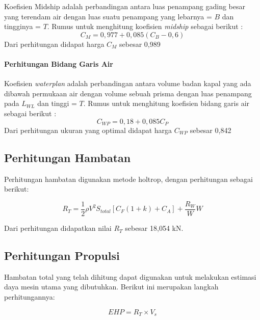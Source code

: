 Koefisien Midship adalah perbandingan antara luas penampang gading besar yang terendam air dengan luas suatu penampang yang lebarnya = $B$ dan tingginya = $T$. Rumus untuk menghitung koefisien \emph{midship} sebagai berikut \cite{Parsons_2001}:
\begin{equation}
    C_M = 0,977 + 0,085 (C_B - 0,6)
\end{equation}
Dari perhitungan didapat harga $C_M$ sebesar 0,989

\paragraph{Perhitungan Bidang Garis Air}

Koefisien \emph{waterplan} adalah perbandingan antara volume badan kapal yang ada dibawah permukaan air dengan volume sebuah prisma dengan luas penampang pada $L_{WL}$ dan tinggi = $T$. Rumus untuk menghitung koefisien bidang garis air sebagai berikut \citep{Parsons_2001}:
\begin{equation}
    C_{WP} = 0,18 + 0,085 C_P
\end{equation}
Dari perhitungan ukuran yang optimal didapat harga $C_{WP}$ sebesar 0,842


\subsection{Perhitungan Hambatan}
\label{subsec:perhitungan-hambatan}

Perhitungan hambatan digunakan metode holtrop, dengan perhitungan sebagai berikut:

\begin{equation}
    R_T = \frac{1}{2}\rho V^{2}S_{total}[C_{F}\left(1+k\right)+ C_{A}]+ \frac{R_{W}}{W}W
\end{equation}

Dari perhitungan didapatkan nilai $R_T$ sebesar 18,054 kN.

\subsection{Perhitungan Propulsi}
\label{subsec:perhitungan-propulsi}

Hambatan total yang telah dihitung dapat digunakan untuk melakukan estimasi daya mesin utama yang dibutuhkan. Berikut ini merupakan langkah perhitungannya:

\begin{equation}
    EHP = R_T \times V_s
\end{equation}

